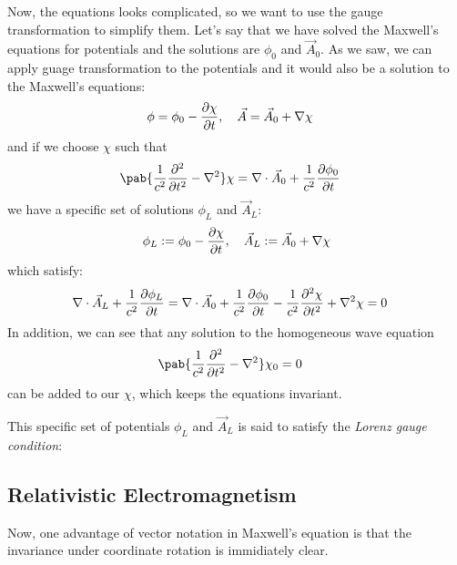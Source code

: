 Now, the equations looks complicated, so we want to use the gauge transformation to simplify them.
Let's say that we have solved the Maxwell's equations for potentials and the solutions are $\phi_0$ and $\vec{A}_0$.
As we saw, we can apply guage transformation to the potentials and it would also be a solution to the Maxwell's equations:
\begin{align}
  \phi & = \phi_0 - \pdv{\chi}{t}, \quad
  \vec{A} = \vec{A}_0 + \nabla \chi
\end{align}
and if we choose $\chi$ such that
\begin{align}
  \pab{\frac{1}{c^2} \pdv[2]{}{t} - \nabla^2} \chi & = \nabla \cdot \vec{A}_0 + \frac{1}{c^2} \pdv{\phi_0}{t}
\end{align}
we have a specific set of solutions $\phi_L$ and $\vec{A}_L$:
\begin{align}
  \phi_L := \phi_0 - \pdv{\chi}{t}, \quad
  \vec{A}_L := \vec{A}_0 + \nabla \chi
\end{align}
which satisfy:
\begin{align}
  \nabla \cdot \vec{A}_L + \frac{1}{c^2} \pdv{\phi_L}{t} & = \nabla \cdot \vec{A}_0 + \frac{1}{c^2} \pdv{\phi_0}{t} - \frac{1}{c^2} \pdv[2]{\chi}{t} + \nabla^2 \chi = 0
\end{align}
In addition, we can see that any solution to the homogeneous wave equation
\begin{align}
  \pab{\frac{1}{c^2} \pdv[2]{}{t} - \nabla^2} \chi_0 & = 0
\end{align}
can be added to our $\chi$, which keeps the equations invariant.

This specific set of potentials $\phi_L$ and $\vec{A}_L$ is said to satisfy the \emph{Lorenz gauge condition}:


\subsection{Relativistic Electromagnetism}
Now, one advantage of vector notation in Maxwell's equation is that the invariance under coordinate rotation is immidiately clear.




\cite{sunakawa-em}
